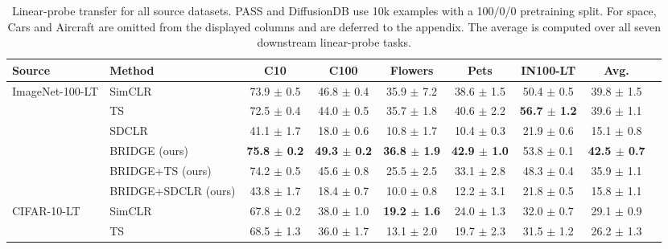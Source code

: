 \begin{table}[t]
\centering
\tiny
\setlength{\tabcolsep}{3.5pt}
\caption{Linear-probe transfer for all source datasets. PASS and DiffusionDB use 10k examples with a 100/0/0 pretraining split. For space, Cars and Aircraft are omitted from the displayed columns and are deferred to the appendix. The average is computed over all seven downstream linear-probe tasks.}
\label{tab:main_sota_linear}
\begin{adjustbox}{max width=\textwidth}
\begin{tabular}{l l c c c c c c c}
\toprule
Source & Method & C10 & C100 & Flowers & Pets & IN100-LT & Avg. \\
\midrule
ImageNet-100-LT & SimCLR & 73.9 {\scriptsize$\pm$ 0.5} & 46.8 {\scriptsize$\pm$ 0.4} & 35.9 {\scriptsize$\pm$ 7.2} & 38.6 {\scriptsize$\pm$ 1.5} & 50.4 {\scriptsize$\pm$ 0.5} & 39.8 {\scriptsize$\pm$ 1.5} \\
 & TS & 72.5 {\scriptsize$\pm$ 0.4} & 44.0 {\scriptsize$\pm$ 0.5} & 35.7 {\scriptsize$\pm$ 1.8} & 40.6 {\scriptsize$\pm$ 2.2} & \textbf{56.7 {\scriptsize$\pm$ 1.2}} & 39.6 {\scriptsize$\pm$ 1.1} \\
 & SDCLR & 41.1 {\scriptsize$\pm$ 1.7} & 18.0 {\scriptsize$\pm$ 0.6} & 10.8 {\scriptsize$\pm$ 1.7} & 10.4 {\scriptsize$\pm$ 0.3} & 21.9 {\scriptsize$\pm$ 0.6} & 15.1 {\scriptsize$\pm$ 0.8} \\
 & BRIDGE (ours) & \textbf{75.8 {\scriptsize$\pm$ 0.2}} & \textbf{49.3 {\scriptsize$\pm$ 0.2}} & \textbf{36.8 {\scriptsize$\pm$ 1.9}} & \textbf{42.9 {\scriptsize$\pm$ 1.0}} & 53.8 {\scriptsize$\pm$ 0.1} & \textbf{42.5 {\scriptsize$\pm$ 0.7}} \\
 & BRIDGE+TS (ours) & 74.2 {\scriptsize$\pm$ 0.5} & 45.6 {\scriptsize$\pm$ 0.8} & 25.5 {\scriptsize$\pm$ 2.5} & 33.1 {\scriptsize$\pm$ 2.8} & 48.3 {\scriptsize$\pm$ 0.4} & 35.9 {\scriptsize$\pm$ 1.1} \\
 & BRIDGE+SDCLR (ours) & 43.8 {\scriptsize$\pm$ 1.7} & 18.4 {\scriptsize$\pm$ 0.7} & 10.0 {\scriptsize$\pm$ 0.8} & 12.2 {\scriptsize$\pm$ 3.1} & 21.8 {\scriptsize$\pm$ 0.5} & 15.8 {\scriptsize$\pm$ 1.1} \\
\midrule
CIFAR-10-LT & SimCLR & 67.8 {\scriptsize$\pm$ 0.2} & 38.0 {\scriptsize$\pm$ 1.0} & \textbf{19.2 {\scriptsize$\pm$ 1.6}} & 24.0 {\scriptsize$\pm$ 1.3} & 32.0 {\scriptsize$\pm$ 0.7} & 29.1 {\scriptsize$\pm$ 0.9} \\
 & TS & 68.5 {\scriptsize$\pm$ 1.3} & 36.0 {\scriptsize$\pm$ 1.7} & 13.1 {\scriptsize$\pm$ 2.0} & 19.7 {\scriptsize$\pm$ 2.3} & 31.5 {\scriptsize$\pm$ 1.2} & 26.2 {\scriptsize$\pm$ 1.3} \\

\end{tabular}
\end{adjustbox}
\end{table}
